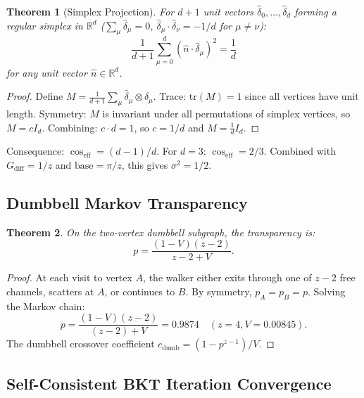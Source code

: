 \documentclass[aps,prd,onecolumn,superscriptaddress,floatfix,12pt]{revtex4-2}
\newcommand{\coseff}{\cos_{\text{eff}}}
\newcommand{\Gdiff}{G_{\text{diff}}}
\newtheorem{theorem}{Theorem}[section]
\begin{document}
\begin{theorem}[Simplex Projection]
For $d{+}1$ unit vectors $\hat{\delta}_0, \ldots, \hat{\delta}_d$ forming a regular simplex in $\mathbb{R}^d$ ($\sum_\mu \hat{\delta}_\mu = 0$, $\hat{\delta}_\mu \cdot \hat{\delta}_\nu = -1/d$ for $\mu \neq \nu$):
\begin{equation}
\frac{1}{d+1}\sum_{\mu=0}^d (\hat{n} \cdot \hat{\delta}_\mu)^2 = \frac{1}{d}
\end{equation}
for any unit vector $\hat{n} \in \mathbb{R}^d$.
\end{theorem}

\begin{proof}
Define $M = \frac{1}{d+1}\sum_\mu \hat{\delta}_\mu \otimes \hat{\delta}_\mu$. Trace: $\text{tr}(M) = 1$ since all vertices have unit length. Symmetry: $M$ is invariant under all permutations of simplex vertices, so $M = cI_d$. Combining: $c \cdot d = 1$, so $c = 1/d$ and $M = \frac{1}{d}I_d$.
\end{proof}

Consequence: $\coseff = (d{-}1)/d$. For $d = 3$: $\coseff = 2/3$. Combined with $\Gdiff = 1/z$ and $\text{base} = \pi/z$, this gives $\sigma^2 = 1/2$.

\subsection{Dumbbell Markov Transparency}\label{sec:A7}

\begin{theorem}
On the two-vertex dumbbell subgraph, the transparency is:
\begin{equation}
p = \frac{(1-V)(z-2)}{z-2+V}.
\end{equation}
\end{theorem}

\begin{proof}
At each visit to vertex $A$, the walker either exits through one of $z - 2$ free channels, scatters at $A$, or continues to $B$. By symmetry, $p_A = p_B = p$. Solving the Markov chain:
\[
p = \frac{(1-V)(z-2)}{(z-2) + V} = 0.9874 \quad (z = 4, V = 0.00845).
\]
The dumbbell crossover coefficient $c_{\text{dumb}} = (1 - p^{z-1})/V$.
\end{proof}

\subsection{Self-Consistent BKT Iteration Convergence}\label{sec:A8}
\end{document}
